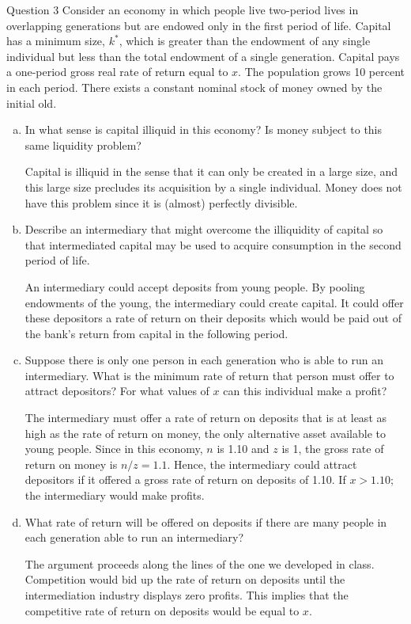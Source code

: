 \documentclass[a4paper]{article}
\newif\IfInSansMode
\numberwithin{equation}{section}
\numberwithin{figure}{section}
\begin{document}
	\begin{questionbox}{Question 3}
		Consider an economy in which people live two-period lives in overlapping generations but are endowed only in the first period of life. Capital has a minimum size, \( k^* \), which is greater than the endowment of any single individual but less than the total endowment of a single generation. Capital pays a one-period gross real rate of return equal to \( x \). The population grows 10 percent in each period. There exists a constant nominal stock of money owned by the initial old.
		\begin{enumerate}[(a)]
			\item In what sense is capital illiquid in this economy? Is money subject to this same liquidity problem?
			\begin{explanationbox}
				Capital is illiquid in the sense that it can only be created in a large size, and this large size precludes its acquisition by a single individual. Money does not have this problem since it is (almost) perfectly divisible.
			\end{explanationbox}
			\item Describe an intermediary that might overcome the illiquidity of capital so that intermediated capital may be used to acquire consumption in the second period of life.
			\begin{explanationbox}
				An intermediary could accept deposits from young people. By pooling endowments of the young, the intermediary could create capital. It could offer these depositors a rate of return on their deposits which would be paid out of the bank's return from capital in the following period.
			\end{explanationbox}
			\item Suppose there is only one person in each generation who is able to run an intermediary. What is the minimum rate of return that person must offer to attract depositors? For what values of \( x \) can this individual make a profit?
			\begin{explanationbox}
				The intermediary must offer a rate of return on deposits that is at least as high as the rate of return on money, the only alternative asset available to young people. Since in this economy, \( n \) is 1.10 and \( z \) is 1, the gross rate of return on money is \( n/z=1.1 \). Hence, the intermediary could attract depositors if it offered a gross rate of return on deposits of 1.10. If \( x > 1.10 \); the intermediary would make profits.
			\end{explanationbox}
			\item What rate of return will be offered on deposits if there are many people in each generation able to run an intermediary?
			\begin{explanationbox}
				The argument proceeds along the lines of the one we developed in class. Competition would bid up the rate of return on deposits until the intermediation industry displays zero profits. This implies that the competitive rate of return on deposits would be equal to \( x \).
			\end{explanationbox}
		\end{enumerate}
	\end{questionbox}
\end{document}

